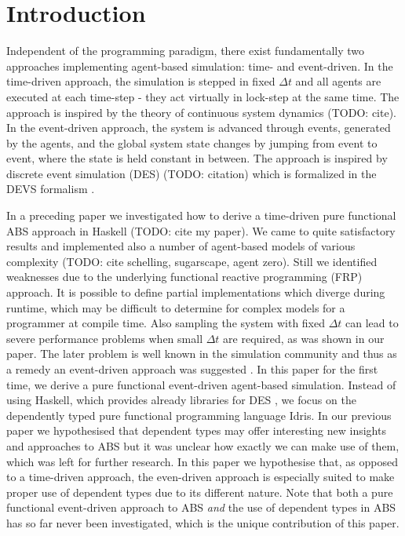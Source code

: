 \section{Introduction}
Independent of the programming paradigm, there exist fundamentally two approaches implementing agent-based simulation: time- and event-driven. In the time-driven approach, the simulation is stepped in fixed $\Delta t$ and all agents are executed at each time-step - they act virtually in lock-step at the same time. The approach is inspired by the theory of continuous system dynamics (TODO: cite).
In the event-driven approach, the system is advanced through events, generated by the agents, and the global system state changes by jumping from event to event, where the state is held constant in between. The approach is inspired by discrete event simulation (DES) (TODO: citation) which is formalized in the DEVS formalism \cite{zeigler_theory_2000}.

In a preceding paper we investigated how to derive a time-driven pure functional ABS approach in Haskell (TODO: cite my paper). We came to quite satisfactory results and implemented also a number of agent-based models of various complexity (TODO: cite schelling, sugarscape, agent zero). Still we identified weaknesses due to the underlying functional reactive programming (FRP) approach. It is possible to define partial implementations which diverge during runtime, which may be difficult to determine for complex models for a programmer at compile time. Also sampling the system with fixed $\Delta t$ can lead to severe performance problems when small $\Delta t$ are required, as was shown in our paper. The later problem is well known in the simulation community and thus as a remedy an event-driven approach was suggested \cite{meyer_event-driven_2014}.
In this paper for the first time, we derive a pure functional event-driven agent-based simulation. Instead of using Haskell, which provides already libraries for DES \cite{sorokin_aivika_2015}, we focus on the dependently typed pure functional programming language Idris. In our previous paper we hypothesised that dependent types may offer interesting new insights and approaches to ABS but it was unclear how exactly we can make use of them, which was left for further research. In this paper we hypothesise that, as opposed to a time-driven approach, the even-driven approach is especially suited to make proper use of dependent types due to its different nature. Note that both a pure functional event-driven approach to ABS \textit{and} the use of dependent types in ABS has so far never been investigated, which is the unique contribution of this paper.

